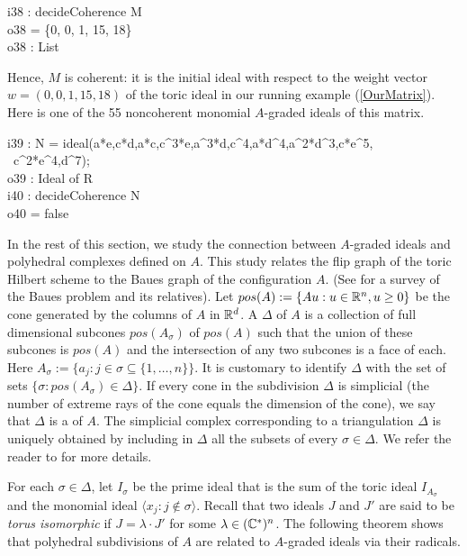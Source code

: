 \beginOutput
i38 : decideCoherence M\\
\emptyLine
o38 = \{0, 0, 1, 15, 18\}\\
\emptyLine
o38 : List\\
\endOutput

Hence, $M$ is coherent: it is the initial ideal with respect to the 
weight vector $w = (0,0,1,15,18)$ of the toric ideal in our running
example (\ref{OurMatrix}). Here is one of the 55 noncoherent
monomial $A$-graded ideals of this matrix.

\beginOutput
i39 : N = ideal(a*e,c*d,a*c,c^3*e,a^3*d,c^4,a*d^4,a^2*d^3,c*e^5,\\
\                 c^2*e^4,d^7);\\
\emptyLine
o39 : Ideal of R\\
\endOutput
\beginOutput
i40 : decideCoherence N\\
\emptyLine
o40 = false\\
\endOutput

In the rest of this section, we study the connection between
$A$-graded ideals and polyhedral complexes defined on $A$.  This study
relates the flip graph of the toric Hilbert scheme to the Baues
graph of the configuration $A$.                  (See \cite{HS:Reiner} for a
survey of the Baues problem and its relatives).  Let $pos(A) := \{ Au
: u \in \mathbb{R}^n, u \geq 0 \}$ be the cone generated by the columns of $A$
in $\mathbb{R}^d$. A {\em {}} $\Delta$ of $A$ is a
collection of full dimensional subcones $pos(A_{\sigma})$ of $pos(A)$
such that the union of these subcones is $pos(A)$ and the intersection
of any two subcones is a face of each.  Here $A_{\sigma} := \{a_j : j
\in \sigma \subseteq \{1,\ldots,n\} \}$.  It is customary to identify 
$\Delta$ with the set of sets $\{ \sigma : pos(A_{\sigma}) \in \Delta
\}$. If every cone in the 
subdivision $\Delta$ is simplicial (the number of extreme rays of the
cone equals the dimension of the cone), we say that $\Delta$ is a {\em
  } of $A$. The simplicial complex corresponding
to a triangulation $\Delta$ is uniquely obtained by including in
$\Delta$ all the subsets of every $\sigma \in \Delta$. We refer the
reader to \cite[\S 8]{HS:St2} for more details.

For each $\sigma \in \Delta$, let $I_{\sigma}$ be the prime ideal 
that is the sum of the toric ideal $I_{A_{\sigma}}$ and the monomial 
ideal $\langle x_j :j \not \in \sigma \rangle$. Recall that two
ideals $J$ and $J'$ are said to be 
{\em torus isomorphic} if $J = \lambda \cdot J'$ for some $\lambda \in 
(\mathbb{C}^{\ast})^n$. The following theorem shows that polyhedral
subdivisions of $A$ are related to $A$-graded ideals via their 
radicals.

